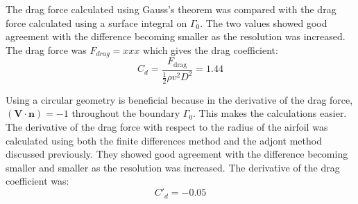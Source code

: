 \documentclass[12pt, a4paper]{article}
\begin{document}
        The drag force calculated using Gauss's theorem was compared with the drag force calculated using a surface integral on $\Gamma_0$. The two values showed good agreement with the difference becoming smaller as the resolution was increased. The drag force was $F_{drag} = xxx$ which gives the drag coefficient:
        \begin{equation}
            C_d = \frac{F_{\text{drag}}}{\frac{1}{2} \rho v^2 D^2} = 1.44
        \end{equation}
        
        Using a circular geometry is beneficial because in the derivative of the drag force, $(\mathbf{V \cdot n}) = -1$ throughout the boundary $\Gamma_0$. This makes the calculations easier. The derivative of the drag force with respect to the radius of the airfoil was calculated using both the finite differences method and the adjont method discussed previously. They showed good agreement with the difference becoming smaller and smaller as the resolution was increased. The derivative of the drag coefficient was:
        \begin{equation}
            C'_d = -0.05
        \end{equation}
        
\end{document}

